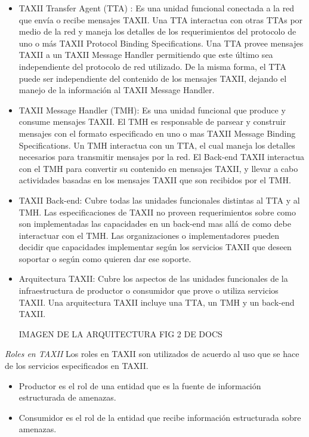 \begin{itemize}
  \item TAXII Transfer Agent (TTA) : Es una unidad funcional conectada a la red 
  que envía o recibe mensajes TAXII. Una TTA interactua con otras TTAs por medio 
  de la red y maneja los detalles de los requerimientos del protocolo de uno o 
  más TAXII Protocol Binding Specifications. Una TTA provee mensajes TAXII a un 
  TAXII Message Handler permitiendo que este último sea independiente del 
  protocolo de red utilizado. De la misma forma, el TTA puede ser independiente 
  del contenido de los mensajes TAXII, dejando el manejo de la información al 
  TAXII Message Handler.
  \item TAXII Message Handler (TMH): Es una unidad funcional que produce y 
  consume mensajes TAXII. El TMH es responsable de parsear y construir mensajes 
  con el formato especificado en uno o mas TAXII Message Binding Specifications. 
  Un TMH interactua con un TTA, el cual maneja los detalles necesarios para 
  transmitir mensajes por la red. El Back-end TAXII interactua con el TMH para 
  convertir su contenido en mensajes TAXII, y llevar a cabo actividades basadas 
  en los mensajes TAXII que son recibidos por el TMH.
  \item TAXII Back-end: Cubre todas las unidades funcionales distintas al TTA y 
  al TMH. Las especificaciones de TAXII no proveen requerimientos sobre como son 
  implementadas las capacidades en un back-end mas allá de como debe interactuar 
  con el TMH. Las organizaciones o implementadores pueden decidir que 
  capacidades implementar según los servicios TAXII que deseen soportar o según 
  como quieren dar ese soporte.
  \item Arquitectura TAXII: Cubre los aspectos de las unidades funcionales de la 
  infraestructura de productor o consumidor que prove o utiliza servicios TAXII. 
  Una arquitectura TAXII incluye una TTA, un TMH y un back-end TAXII.
  
  IMAGEN DE LA ARQUITECTURA FIG 2 DE DOCS
  
\end{itemize}
\emph{Roles en TAXII}
Los roles en TAXII son utilizados de acuerdo al uso que se hace de los servicios 
especificados en TAXII.
\begin{itemize}
  \item Productor es el rol de una entidad que es la fuente de información 
  estructurada de amenazas.
  \item Consumidor es el rol de la entidad que recibe información estructurada 
  sobre amenazas.
\end{itemize}

